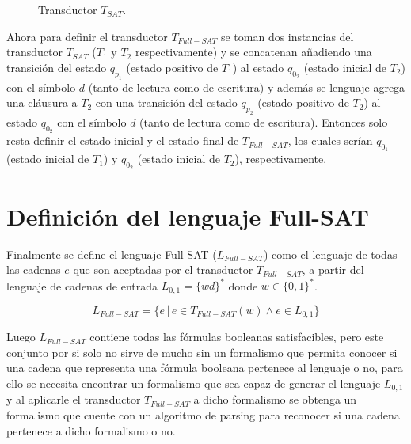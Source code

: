 \documentclass{article}
\begin{document}
\begin{figure}[h]
    \centering        {}
    \caption{Transductor $T_{SAT}$.}
    \label{fig:transducer} %
\end{figure}

Ahora para definir el transductor $T_{Full-SAT}$ se toman dos instancias del transductor $T_{SAT}$ ($T_1$ y $T_2$ respectivamente) y se concatenan
añadiendo una transición del estado $q_{p_1}$ (estado positivo de $T_1$) al estado $q_{0_2}$ (estado inicial de $T_2$) con el símbolo $d$ (tanto de
lectura como de escritura) y además se lenguaje agrega una cláusura a $T_2$ con una transición del estado $q_{p_2}$
(estado positivo de $T_2$) al estado $q_{0_2}$ con el símbolo $d$ (tanto de lectura como de escritura). Entonces solo resta definir
el estado inicial y el estado final de $T_{Full-SAT}$, los cuales serían $q_{0_1}$ (estado inicial de $T_1$) y $q_{0_2}$ (estado inicial de $T_2$),
respectivamente.

\section{Definición del lenguaje Full-SAT}

Finalmente se define el lenguaje Full-SAT (\textit{$L_{Full-SAT}$}) como el lenguaje de todas las cadenas $e$ que son aceptadas por el transductor $T_{Full-SAT}$, a partir del lenguaje
de cadenas de entrada $L_{0,1}=\{wd\}^*$ donde $w\in \{0,1\}^*$. 

$$L_{Full-SAT} = \{e\,|\,e \in T_{Full-SAT}(w) \wedge e \in L_{0,1}\}$$

Luego $L_{Full-SAT}$ contiene todas las fórmulas booleanas satisfacibles, pero este conjunto por si solo no sirve de mucho sin un formalismo
que permita conocer si una cadena que representa una fórmula booleana pertenece al lenguaje o no, para ello se necesita encontrar un formalismo que sea capaz
de generar el lenguaje $L_{0,1}$ y al aplicarle el transductor $T_{Full-SAT}$ a dicho formalismo se obtenga un formalismo que cuente con un algoritmo de parsing
para reconocer si una cadena pertenece a dicho formalismo o no.
\end{document}
